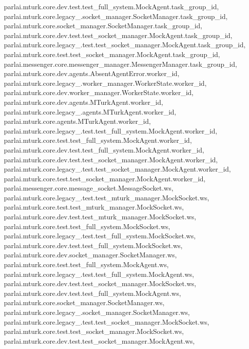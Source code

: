 parlai.\+mturk.\+core.\+dev.\+test.\+test\+\_\+full\+\_\+system.\+Mock\+Agent.\+task\+\_\+group\+\_\+id, parlai.\+mturk.\+core.\+legacy\+\_.\+socket\+\_\+manager.\+Socket\+Manager.\+task\+\_\+group\+\_\+id, parlai.\+mturk.\+core.\+socket\+\_\+manager.\+Socket\+Manager.\+task\+\_\+group\+\_\+id, parlai.\+mturk.\+core.\+dev.\+test.\+test\+\_\+socket\+\_\+manager.\+Mock\+Agent.\+task\+\_\+group\+\_\+id, parlai.\+mturk.\+core.\+legacy\+\_.\+test.\+test\+\_\+socket\+\_\+manager.\+Mock\+Agent.\+task\+\_\+group\+\_\+id, parlai.\+mturk.\+core.\+test.\+test\+\_\+socket\+\_\+manager.\+Mock\+Agent.\+task\+\_\+group\+\_\+id, parlai.\+messenger.\+core.\+messenger\+\_\+manager.\+Messenger\+Manager.\+task\+\_\+group\+\_\+id, parlai.\+mturk.\+core.\+dev.\+agents.\+Absent\+Agent\+Error.\+worker\+\_\+id, parlai.\+mturk.\+core.\+legacy\+\_.\+worker\+\_\+manager.\+Worker\+State.\+worker\+\_\+id, parlai.\+mturk.\+core.\+dev.\+worker\+\_\+manager.\+Worker\+State.\+worker\+\_\+id, parlai.\+mturk.\+core.\+dev.\+agents.\+M\+Turk\+Agent.\+worker\+\_\+id, parlai.\+mturk.\+core.\+legacy\+\_.\+agents.\+M\+Turk\+Agent.\+worker\+\_\+id, parlai.\+mturk.\+core.\+agents.\+M\+Turk\+Agent.\+worker\+\_\+id, parlai.\+mturk.\+core.\+legacy\+\_.\+test.\+test\+\_\+full\+\_\+system.\+Mock\+Agent.\+worker\+\_\+id, parlai.\+mturk.\+core.\+test.\+test\+\_\+full\+\_\+system.\+Mock\+Agent.\+worker\+\_\+id, parlai.\+mturk.\+core.\+dev.\+test.\+test\+\_\+full\+\_\+system.\+Mock\+Agent.\+worker\+\_\+id, parlai.\+mturk.\+core.\+dev.\+test.\+test\+\_\+socket\+\_\+manager.\+Mock\+Agent.\+worker\+\_\+id, parlai.\+mturk.\+core.\+legacy\+\_.\+test.\+test\+\_\+socket\+\_\+manager.\+Mock\+Agent.\+worker\+\_\+id, parlai.\+mturk.\+core.\+test.\+test\+\_\+socket\+\_\+manager.\+Mock\+Agent.\+worker\+\_\+id, parlai.\+messenger.\+core.\+message\+\_\+socket.\+Message\+Socket.\+ws, parlai.\+mturk.\+core.\+legacy\+\_.\+test.\+test\+\_\+mturk\+\_\+manager.\+Mock\+Socket.\+ws, parlai.\+mturk.\+core.\+test.\+test\+\_\+mturk\+\_\+manager.\+Mock\+Socket.\+ws, parlai.\+mturk.\+core.\+dev.\+test.\+test\+\_\+mturk\+\_\+manager.\+Mock\+Socket.\+ws, parlai.\+mturk.\+core.\+test.\+test\+\_\+full\+\_\+system.\+Mock\+Socket.\+ws, parlai.\+mturk.\+core.\+legacy\+\_.\+test.\+test\+\_\+full\+\_\+system.\+Mock\+Socket.\+ws, parlai.\+mturk.\+core.\+dev.\+test.\+test\+\_\+full\+\_\+system.\+Mock\+Socket.\+ws, parlai.\+mturk.\+core.\+dev.\+socket\+\_\+manager.\+Socket\+Manager.\+ws, parlai.\+mturk.\+core.\+test.\+test\+\_\+full\+\_\+system.\+Mock\+Agent.\+ws, parlai.\+mturk.\+core.\+legacy\+\_.\+test.\+test\+\_\+full\+\_\+system.\+Mock\+Agent.\+ws, parlai.\+mturk.\+core.\+dev.\+test.\+test\+\_\+socket\+\_\+manager.\+Mock\+Socket.\+ws, parlai.\+mturk.\+core.\+dev.\+test.\+test\+\_\+full\+\_\+system.\+Mock\+Agent.\+ws, parlai.\+mturk.\+core.\+socket\+\_\+manager.\+Socket\+Manager.\+ws, parlai.\+mturk.\+core.\+legacy\+\_.\+socket\+\_\+manager.\+Socket\+Manager.\+ws, parlai.\+mturk.\+core.\+legacy\+\_.\+test.\+test\+\_\+socket\+\_\+manager.\+Mock\+Socket.\+ws, parlai.\+mturk.\+core.\+test.\+test\+\_\+socket\+\_\+manager.\+Mock\+Socket.\+ws, parlai.\+mturk.\+core.\+dev.\+test.\+test\+\_\+socket\+\_\+manager.\+Mock\+Agent.\+ws, 